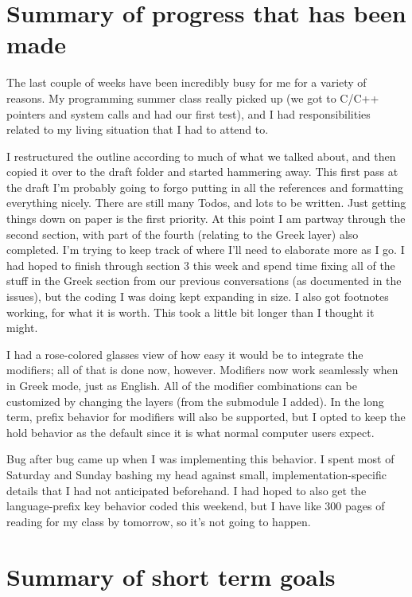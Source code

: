 \documentclass[11pt]{article}
\date{\today}
\title{}
\begin{document}
\tableofcontents


\section{Summary of progress that has been made}
\label{sec:org527aa07}

The last couple of weeks have been incredibly busy for me for a variety of reasons. My programming summer class really picked up (we got to C/C++ pointers and system calls and had our first test), and I had responsibilities related to my living situation that I had to attend to.

I restructured the outline according to much of what we talked about, and then copied it over to the draft folder and started hammering away. This first pass at the draft I'm probably going to forgo putting in all the references and formatting everything nicely. There are still many Todos, and lots to be written. Just getting things down on paper is the first priority. At this point I am partway through the second section, with part of the fourth (relating to the Greek layer) also completed. I'm trying to keep track of where I'll need to elaborate more as I go. I had hoped to finish through section 3 this week and spend time fixing all of the stuff in the Greek section from our previous conversations (as documented in the issues), but the coding I was doing kept expanding in size. I also got footnotes working, for what it is worth. This took a little bit longer than I thought it might.

I had a rose-colored glasses view of how easy it would be to integrate the modifiers; all of that is done now, however. Modifiers now work seamlessly when in Greek mode, just as English. All of the modifier combinations can be customized by changing the layers (from the submodule I added). In the long term, prefix behavior for modifiers will also be supported, but I opted to keep the hold behavior as the default since it is what normal computer users expect.

Bug after bug came up when I was implementing this behavior. I spent most of Saturday and Sunday bashing my head against small, implementation-specific details that I had not anticipated beforehand. I had hoped to also get the language-prefix key behavior coded this weekend, but I have like 300 pages of reading for my class by tomorrow, so it's not going to happen.

\section{Summary of short term goals}
\label{sec:orgcdd45f1}
\end{document}
